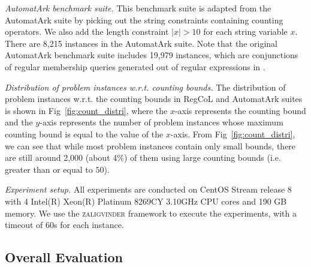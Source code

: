 \medskip
\noindent
\emph{AutomatArk benchmark suite.}
This benchmark suite is adapted from the AutomatArk suite \cite{z3str3re} by picking out the string constraints containing counting operators. We also add the length constraint $|x| > 10$ for each string variable $x$. There are 8,215 instances in the AutomatArk suite.
Note that the original AutomatArk benchmark suite \cite{z3str3re} includes 19,979 instances, which are conjunctions of regular membership queries generated out of regular expressions in \cite{automatark}.

\medskip
\noindent
{}

\medskip
\noindent
\emph{Distribution of problem instances w.r.t. counting bounds. }
The distribution of problem instances w.r.t. the counting bounds in RegCoL and AutomatArk suites is shown in Fig~\ref{fig:count_distri}, where the $x$-axis represents the counting bound and the $y$-axis represents the number of problem instances whose maximum counting bound is equal to the value of the $x$-axis. 
From Fig~\ref{fig:count_distri}, we can see that while most problem instances contain only small bounds, there are still around 2,000  (about 4\%) of them using large counting bounds (i.e. greater than or equal to $50$).

\medskip
\noindent
\emph{Experiment setup.}
All experiments are conducted on CentOS Stream release 8 with 4 Intel(R) Xeon(R) Platinum 8269CY 3.10GHz CPU cores and 190 GB memory. We use the \textsc{zaligvinder} framework \cite{zaligvinder_2021} to execute the experiments, with a timeout of 60s for each instance.


\subsection{Overall Evaluation}\label{subsec:overall_eval}

